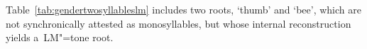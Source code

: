 Table~\ref{tab:gendertwosyllableslm} includes two roots, ‘thumb' and ‘bee', which are not synchronically attested as monosyllables, but whose internal reconstruction yields a~LM"=tone root.

\begin{subtables}
	\label{tab:gendertwo}


\end{subtables}
